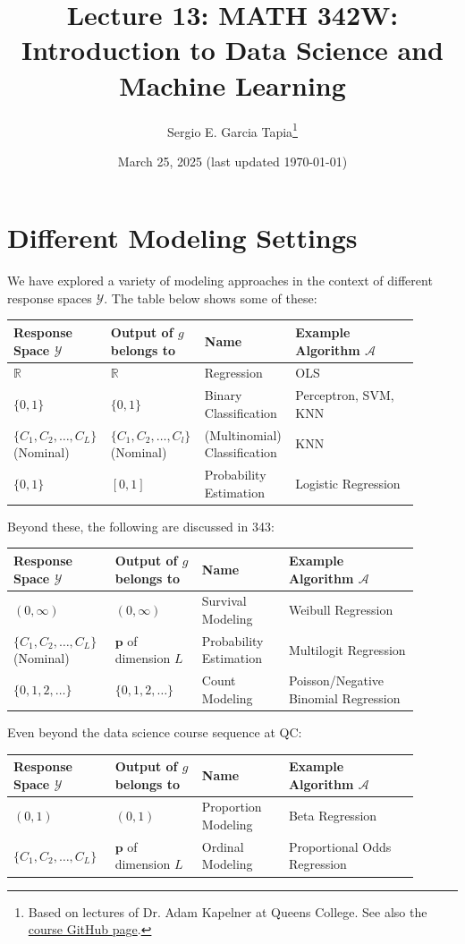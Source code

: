 \documentclass[12pt, a4paper]{article}
\title{Lecture 13: MATH 342W: Introduction to Data Science and Machine Learning}
\author{Sergio E. Garcia Tapia\thanks{Based on lectures of Dr. Adam Kapelner at Queens College.
See also the \href{https://github.com/kapelner/QC_MATH_342W_Spring_2025}{course GitHub page}.}}
\date{March 25, 2025 (last updated \today)}
\theoremstyle{definition}
\begin{document}
	\maketitle
	\section*{Different Modeling Settings}
	We have explored a variety of modeling approaches in the context of
	different response spaces $\mathcal{Y}$. The table below shows some of these:
	\begin{center}
		\begin{tabular}{p{0.2\linewidth}|p{0.2\linewidth}|p{0.2\linewidth}|p{0.3\linewidth}}
			\textbf{Response Space} $\mathcal{Y}$ & \textbf{Output of $g$ belongs to } &
			\textbf{Name} & \textbf{Example Algorithm $\mathcal{A}$}\\
			\hline
			$\mathbb{R}$ & $\mathbb{R}$ & Regression & OLS\\
			\hline
			$\{0,1\}$ & $\{0,1\}$ & Binary Classification & Perceptron, SVM, KNN\\
			\hline
			$\{C_1,C_2,\ldots,C_L\}$ (Nominal) & $\{C_1,C_2,\ldots,C_l\}$ (Nominal) & (Multinomial) Classification & KNN\\
			\hline
			$\{0,1\}$ & $[0,1]$ & Probability Estimation & Logistic Regression
		\end{tabular}
	\end{center}
	Beyond these, the following are discussed in 343:
	\begin{center}
		\begin{tabular}{p{0.2\linewidth}|p{0.2\linewidth}|p{0.2\linewidth}|p{0.3\linewidth}}
			\textbf{Response Space} $\mathcal{Y}$ & \textbf{Output of $g$ belongs to } &
			\textbf{Name} & \textbf{Example Algorithm $\mathcal{A}$}\\
			\hline
			$(0,\infty)$ & $(0,\infty)$ & Survival Modeling & Weibull Regression\\
			\hline
			$\{C_1,C_2,\ldots,C_L\}$ (Nominal) & $\bm{p}$ of dimension $L$ & Probability Estimation & Multilogit Regression\\
			\hline
			$\{0,1,2,\ldots\}$ & $\{0,1,2,\ldots\}$ & Count Modeling & Poisson/Negative Binomial Regression
		\end{tabular}
	\end{center}
	Even beyond the data science course sequence at QC:
	\begin{center}
		\begin{tabular}{p{0.2\linewidth}|p{0.2\linewidth}|p{0.2\linewidth}|p{0.3\linewidth}}
			\textbf{Response Space} $\mathcal{Y}$ & \textbf{Output of $g$ belongs to } &
			\textbf{Name} & \textbf{Example Algorithm $\mathcal{A}$}\\
			\hline
			$(0,1)$ & $(0,1)$ & Proportion Modeling & Beta Regression\\
			\hline
			$\{C_1,C_2,\ldots,C_L\}$ & $\bm{p}$ of dimension $L$ & Ordinal Modeling & Proportional Odds Regression
		\end{tabular}
	\end{center}
\end{document}
